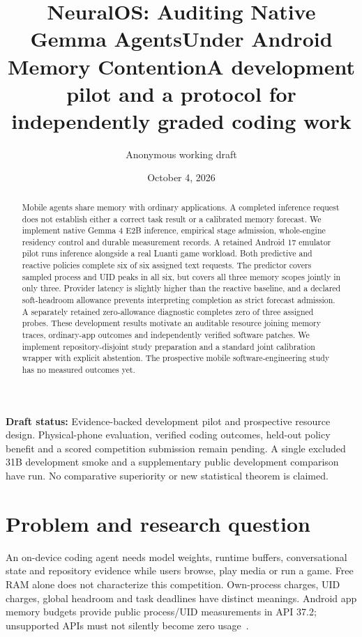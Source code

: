 \documentclass[10pt,twocolumn]{article}
\title{NeuralOS: Auditing Native Gemma Agents\newline Under Android Memory Contention\newline\large A development pilot and a protocol for independently graded coding work}
\author{Anonymous working draft}
\date{October 4, 2026}
\begin{document}
\maketitle
\begin{abstract}
Mobile agents share memory with ordinary applications. A completed inference
request does not establish either a correct task result or a calibrated memory
forecast. We implement native Gemma 4 E2B inference, empirical stage admission,
whole-engine residency control and durable measurement records. A retained
Android 17 emulator pilot runs inference alongside a real Luanti game workload.
Both predictive and reactive policies complete six of six assigned text requests.
The predictor covers sampled process and UID peaks in all six, but covers all
three memory scopes jointly in only three. Provider latency is slightly higher
than the reactive baseline, and a declared soft-headroom allowance prevents
interpreting completion as strict forecast admission. A separately retained
zero-allowance diagnostic completes zero of three assigned probes. These development results
motivate an auditable resource joining memory traces, ordinary-app outcomes and
independently verified software patches. We implement repository-disjoint study
preparation and a standard joint calibration wrapper with explicit abstention.
The prospective mobile software-engineering study has no measured outcomes yet.
\end{abstract}
\noindent\textbf{Draft status:} Evidence-backed development pilot and prospective
resource design. Physical-phone evaluation, verified coding outcomes, held-out
policy benefit and a scored competition submission remain pending. A single
excluded 31B development smoke and a supplementary public development comparison
have run. No comparative superiority or new
statistical theorem is claimed.

\section{Problem and research question}
An on-device coding agent needs model weights, runtime buffers, conversational
state and repository evidence while users browse, play media or run a game.
Free RAM alone does not characterize this competition. Own-process charges,
UID charges, global headroom and task deadlines have distinct meanings. Android
app memory budgets provide public process/UID measurements in API 37.2;
unsupported APIs must not silently become zero usage~\cite{budget}.
\end{document}
